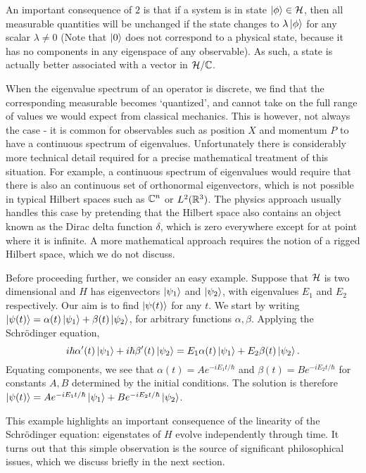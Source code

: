 \documentclass[a4paper]{article}
\begin{document}
An important consequence of $2$ is that if a system is in state $\left\lvert \phi \right\rangle \in \mathcal{H}$, then all measurable quantities will be unchanged if the state changes to $\lambda\left\lvert \phi \right\rangle$ for any scalar $\lambda \neq 0$ (Note that $\left\lvert 0 \right\rangle$ does not correspond to a physical state, because it has no components in any eigenspace of any observable). As such, a state is actually better associated with a vector in $\mathcal{H} / \mathbb{C}$.

When the eigenvalue spectrum of an operator is discrete, we find that the corresponding measurable becomes `quantized', and cannot take on the full range of values we would expect from classical mechanics. This is however, not always the case - it is common for observables such as position $X$ and momentum $P$ to have a continuous spectrum of eigenvalues. Unfortunately there is considerably more technical detail required for a precise mathematical treatment of this situation. For example, a continuous spectrum of eigenvalues would require that there is also an continuous set of orthonormal eigenvectors, which is not possible in typical Hilbert spaces such as $\mathbb{C}^n$ or $L^2(\mathbb{R}^3)$. The physics approach usually handles this case by pretending that the Hilbert space also contains an object known as the Dirac delta function $\delta$, which is zero everywhere except for at point where it is infinite. A more mathematical approach requires the notion of a rigged Hilbert space, which we do not discuss.

Before proceeding further, we consider an easy example. Suppose that $\mathcal{H}$ is two dimensional and $H$ has eigenvectors $\left\lvert \psi_1 \right\rangle$ and $\left\lvert \psi_2 \right\rangle$, with eigenvalues $E_1$ and $E_2$ respectively. Our aim is to find $\left\lvert \psi(t) \right\rangle$ for any $t$. We start by writing $\left\lvert \psi(t) \right\rangle = \alpha(t) \left\lvert \psi_1 \right\rangle + \beta(t) \left\lvert \psi_2 \right\rangle$, for arbitrary functions $\alpha, \beta$. Applying the Schr\"{o}dinger equation, 
$$i\hbar \alpha'(t) \left\lvert \psi_1 \right\rangle + i\hbar \beta'(t) \left\lvert \psi_2 \right\rangle = E_1 \alpha(t) \left\lvert \psi_1 \right\rangle + E_2 \beta(t) \left\lvert \psi_2 \right\rangle.$$
Equating components, we see that $\alpha(t) = Ae^{-iE_1t/\hbar}$ and $\beta(t) = Be^{-iE_2t/\hbar}$ for constants $A, B$ determined by the initial conditions. The solution is therefore $\left\lvert \psi(t) \right\rangle = Ae^{-iE_1t/\hbar}\left\lvert \psi_1 \right\rangle + Be^{-iE_2t/\hbar}\left\lvert \psi_2 \right\rangle$. 

This example highlights an important consequence of the linearity of the Schr\"{o}dinger equation: eigenstates of $H$ evolve independently through time. It turns out that this simple observation is the source of significant philosophical issues, which we discuss briefly in the next section.
\end{document}
